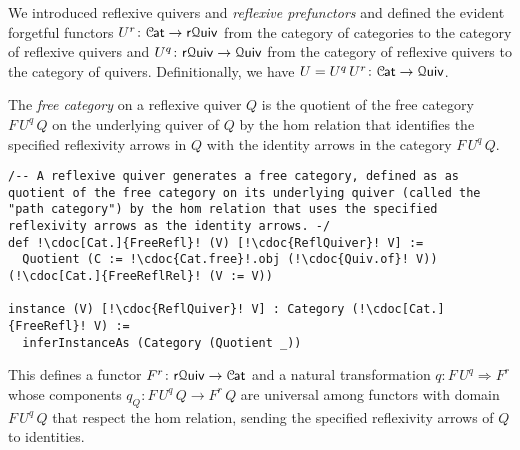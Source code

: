 \documentclass[a4paper,UKenglish,cleveref, autoref, thm-restate]{lipics-v2021}
\newcommand{\cat}[1]{\textup{\textsf{#1}}}%
\newcommand{\1}{\mathbbe{1}}
\newcommand{\2}{\mathbbe{2}}
\newcommand{\3}{\mathbbe{3}}
\newcommand{\Cat}{\mathcal{C}{\kern-.75pt}\cat{at}}
\newcommand{\Quiv}{\mathcal{Q}\cat{uiv}}
\newcommand{\rQuiv}{\cat{r}\mathcal{Q}\cat{uiv}}
\newcommand{\cdoc}[2][]{\href{https://leanprover-community.github.io/mathlib4_docs/find/?pattern=CategoryTheory.#1#2\#doc}{\texttt{#2}}}
\begin{document}
We introduced reflexive quivers and \emph{reflexive prefunctors} and defined the evident forgetful functors $U^r \colon \Cat \to \rQuiv$ from the category of categories to the category of reflexive quivers and $U^q \colon \rQuiv \to \Quiv$ from the category of reflexive quivers to the category of quivers. Definitionally, we have $U = U^q\,U^r \colon \Cat \to \Quiv$.


\begin{definition}[\cdoc{Cat.FreeRefl}] The \emph{free category} on a reflexive quiver $Q$ is the quotient of the free category $F\,U^q\,Q$ on the underlying quiver of $Q$ by the hom relation that identifies the specified reflexivity arrows in $Q$ with the identity arrows in the category $F\,U^q\,Q$.
\end{definition}

\begin{lstlisting}
/-- A reflexive quiver generates a free category, defined as as quotient of the free category on its underlying quiver (called the "path category") by the hom relation that uses the specified reflexivity arrows as the identity arrows. -/
def !\cdoc[Cat.]{FreeRefl}! (V) [!\cdoc{ReflQuiver}! V] :=
  Quotient (C := !\cdoc{Cat.free}!.obj (!\cdoc{Quiv.of}! V)) (!\cdoc[Cat.]{FreeReflRel}! (V := V))

instance (V) [!\cdoc{ReflQuiver}! V] : Category (!\cdoc[Cat.]{FreeRefl}! V) :=
  inferInstanceAs (Category (Quotient _))
\end{lstlisting}



This defines a functor $F^r \colon \rQuiv \to \Cat$ and a natural transformation $q \colon F\,U^q \Rightarrow F^r$ whose components $q_Q \colon F\,U^q\,Q \to F^r\,Q$ are universal among functors with domain $F\,U^q\,Q$ that respect the hom relation, sending the specified reflexivity arrows of $Q$ to identities.
\end{document}

